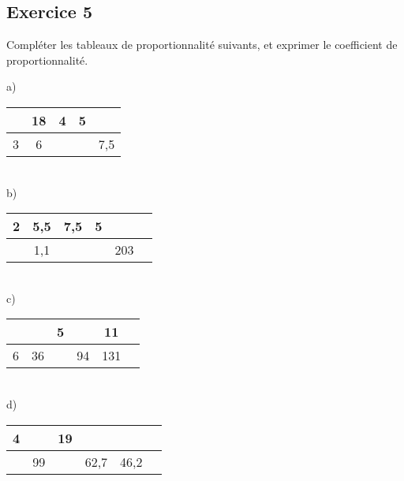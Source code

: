 \documentclass[12 pt]{extarticle}
\theoremstyle{plain}
\begin{document}
 
 \subsection*{Exercice 5}

Compléter les tableaux de proportionnalité suivants, et exprimer le coefficient de proportionnalité. 

a) \begin{tabular}{ | c |c | c| c|c| }\hline
 & 18  & 4 & 5 & \\
 \hline
 3 & 6 &  &  & 7,5 \\ \hline
\end{tabular} 

 \ \\ 
 
b) \begin{tabular}{|c | c | c | c | c | c}
\hline
2 & 5,5  & 7,5 &  5 &  \\
\hline
 & 1,1 & & &203 \\ \hline

\end{tabular}

 \ \\ 
 
 
c) \begin{tabular}{|c | c | c | c | c | c}
\hline
&  & 5 &   & 11      \\
\hline
6& 36 &  & 94  & 131  \\ \hline

\end{tabular}

 \ \\ 
 
d) \begin{tabular}{|c | c | c | c | c | c}
\hline
4 &  & 19 &   &  \\
\hline
& 99 &  & 62,7 & 46,2 \\ \hline

\end{tabular}
\end{document}
